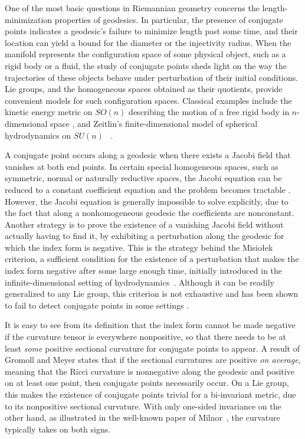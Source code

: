 \documentclass[oneside, 11pt]{amsart}
\numberwithin{equation}{section}
\begin{document}
One of the most basic questions in Riemannian geometry concerns the length-minimization properties of geodesics. In particular, the presence of conjugate points indicates a geodesic’s failure to minimize length past some time, and their location can yield a bound for the diameter or the injectivity radius. When the manifold represents the configuration space of some physical object, such as a rigid body or a fluid, the study of conjugate points sheds light on the way the trajectories of these objects behave under perturbation of their initial conditions. Lie groups, and the homogeneous spaces obtained as their quotients, provide convenient models for such configuration spaces. 
Classical examples include the kinetic energy metric on $SO(n)$ describing the motion of a free rigid body in $n$-dimensional space \cite{Frahm}, and Zeitlin's finite-dimensional model of spherical hydrodynamics on $SU(n)$ ~\cite{Zeitlin}. 

A conjugate point occurs along a geodesic when there exists a Jacobi field that vanishes at both end points. In certain special homogeneous spaces, such as symmetric, normal or naturally reductive spaces, the Jacobi equation can be reduced to a constant coefficient equation and the problem becomes tractable \cite{Chavel, Chavel2, Chavel3, herring, Ziller, Ziller2}. However, the Jacobi equation is generally impossible to solve explicitly, due to the fact that along a nonhomogeneous geodesic the coefficients are nonconstant.  
Another strategy is to prove the existence of a vanishing Jacobi field without actually having to find it, by exhibiting a perturbation along the geodesic for which the index form is negative. This is the strategy behind the Misio{\l}ek criterion, a sufficient condition for the existence of a perturbation that makes the index form negative after some large enough time, initially introduced in the infinite-dimensional setting of hydrodynamics~\cite{M1}. Although it can be readily generalized to any Lie group, this criterion is not exhaustive and has been shown to fail to detect conjugate points in some settings \cite{lbpreston}.

It is easy to see from its definition that the index form cannot be made negative if the curvature tensor is everywhere nonpositive, so that there needs to be at least \emph{some} positive sectional curvature for conjugate points to appear. A result of Gromoll and Meyer \cite{GM} states that if the sectional curvatures are positive \emph{on average}, meaning that the Ricci curvature is nonnegative along the geodesic and positive on at least one point, then conjugate points necessarily occur. On a Lie group, this makes the existence of conjugate points trivial for a bi-invariant metric, due to its nonpositive sectional curvature. With only one-sided invariance on the other hand, as illustrated in the well-known paper of Milnor~\cite{Milnor}, the curvature typically takes on both signs. 
\end{document}
